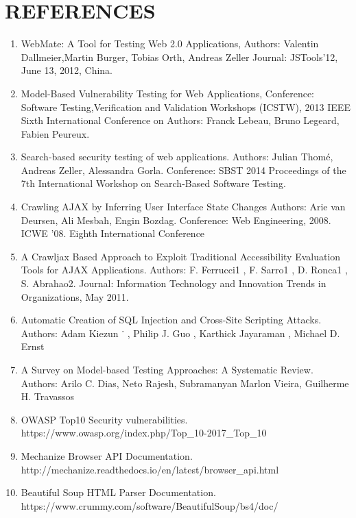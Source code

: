 \chapter{REFERENCES}
\begin{enumerate}  
\item WebMate: A Tool for Testing Web 2.0 Applications, Authors: Valentin Dallmeier,Martin Burger, Tobias Orth, Andreas Zeller Journal: JSTools'12, June 13, 2012, China.
  \newblock
\item Model-Based Vulnerability Testing for Web Applications, Conference: Software Testing,Verification and Validation Workshops (ICSTW), 2013 IEEE Sixth International Conference on Authors: Franck Lebeau, Bruno Legeard, Fabien Peureux.
\newblock
\item Search-based security testing of web applications. Authors: Julian Thomé, Andreas Zeller, Alessandra Gorla. Conference: SBST 2014 Proceedings of the 7th International Workshop on Search-Based Software Testing.
\item Crawling AJAX by Inferring User Interface State Changes Authors: Arie van Deursen, Ali Mesbah, Engin Bozdag. Conference: Web Engineering, 2008. ICWE '08. Eighth International Conference
\item A Crawljax Based Approach to Exploit Traditional Accessibility Evaluation Tools for AJAX Applications. Authors: F. Ferrucci1 , F. Sarro1 , D. Ronca1 , S. Abrahao2. Journal: Information Technology and Innovation Trends in Organizations, May 2011.
\item Automatic Creation of SQL Injection and Cross-Site Scripting Attacks. Authors: Adam Kiezun ˙ ,
Philip J. Guo , Karthick Jayaraman , Michael D. Ernst
\item A Survey on Model-based Testing Approaches: A Systematic Review. Authors: Arilo C. Dias, Neto Rajesh, Subramanyan
 Marlon Vieira, Guilherme H. Travassos
\item OWASP Top10 Security vulnerabilities. \\
https://www.owasp.org/index.php/Top\_10-2017\_Top\_10
\item Mechanize Browser API Documentation.\\
http://mechanize.readthedocs.io/en/latest/browser\_api.html
\item Beautiful Soup HTML Parser Documentation.\\
https://www.crummy.com/software/BeautifulSoup/bs4/doc/
\end{enumerate}